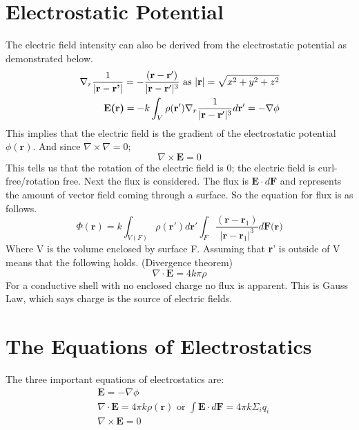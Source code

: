 \section{Electrostatic Potential}
The electric field intensity can also be derived from the electrostatic potential as demonstrated below.
\begin{equation}
    \begin{aligned}
        \nabla_r \frac{1}{|\textbf{r}-\textbf{r'}|} = - \frac{(\textbf{r}-\textbf{r}')}{|\textbf{r}-\textbf{r}'|^3} \text{   as   } |\textbf{r}| = \sqrt{x^2+y^2+z^2}\\
        \textbf{E(\textbf{r})} = -k \int_V \rho  (\textbf{r}')\nabla_r \frac{1}{|\textbf{r}-\textbf{r}'|^3}d\textbf{r}' = -\nabla\phi
    \end{aligned}
\end{equation}
This implies that the electric field is the gradient of the electrostatic potential $\phi(\textbf{r})$. And since $\nabla \times \nabla = 0$;
\begin{equation}
    \nabla \times \textbf{E} = 0
\end{equation}
This tells us that the rotation of the electric field is 0; the electric field is curl-free/rotation free. Next the flux is considered. The flux is $\textbf{E} \cdot d\textbf{F}$ and represents the amount of vector field coming through a surface. So the equation for flux is as follows.
\begin{equation}
    \Phi(\textbf{r}) = k\int_{V(F)} \rho(\textbf{r}') d\textbf{r}'\int_F\frac{(\textbf{r}-\textbf{r}_1)}{|\textbf{r}-\textbf{r}_1|^3} d\textbf{F(r)}
\end{equation}
Where V is the volume enclosed by surface F. Assuming that \textbf{r}' is outside of V means that the following holds. (Divergence theorem) 
\begin{equation}
    \nabla \cdot \textbf{E} = 4k\pi \rho
\end{equation}
For a conductive shell with no enclosed charge no flux is apparent. This is Gauss Law, which says charge is the source of electric fields.
\section{The Equations of Electrostatics}

The three important equations of electrostatics are:
\begin{equation}
    \begin{aligned}
        &\textbf{E} = -\nabla \phi \\
        &\nabla \cdot \textbf{E} = 4\pi k \rho(\textbf{r}) \text{   or   } \int\textbf{E}\cdot d \textbf{F} = 4\pi k \Sigma_i q_i\\
        &\nabla \times \textbf{E} = 0
    \end{aligned}
\end{equation}

